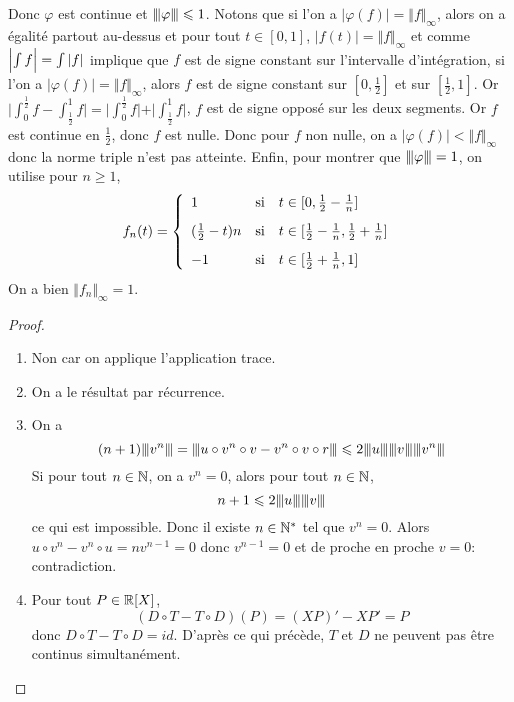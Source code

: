 Donc $\varphi$ est continue et ${\left\vert\kern-0.25ex\left\vert\kern-0.25ex\left\vert{}\varphi \right\vert\kern-0.25ex\right\vert\kern-0.25ex\right\vert}\leqslant1$. Notons que si l'on a $\vert\varphi(f)\vert=\Vert f\Vert_{\infty}$, alors on a égalité partout au-dessus et pour tout $t\in[0,1]$, $\vert f(t)\vert=\Vert f\Vert_{\infty}$ et comme $\Bigl\vert\int f\Bigr\vert=\int\vert f\vert$ implique que $f$ est de signe constant sur l'intervalle d'intégration, si l'on a $\vert\varphi(f)\vert=\Vert f\Vert_{\infty}$, alors $f$ est de signe constant sur $[0,\frac{1}{2}]$ et sur $[\frac{1}{2},1]$.  Or $\vert\int_{0}^{\frac{1}{2}}f-\int_{\frac{1}{2}}^{1}f\vert=\vert\int_{0}^{\frac{1}{2}}f\vert+\vert\int_{\frac{1}{2}}^{1}f\vert$, $f$ est de signe opposé sur les deux segments. Or $f$ est continue en $\frac{1}{2}$, donc $f$ est nulle. Donc pour $f$ non nulle, on a $\vert\varphi(f)\vert<\Vert f\Vert_{\infty}$ donc la norme triple n'est pas atteinte. Enfin, pour montrer que ${\left\vert\kern-0.25ex\left\vert\kern-0.25ex\left\vert{}\varphi \right\vert\kern-0.25ex\right\vert\kern-0.25ex\right\vert}=1$, on utilise pour $n\geqslant1$,
\begin{equation}
f_{n}(t)=
\left\{
	\begin{array}[]{lll}
		1 & \text{si} & t\in[0,\frac{1}{2}-\frac{1}{n}]\\[0.3cm]
		(\frac{1}{2}-t)n & \text{si} & t\in[\frac{1}{2}-\frac{1}{n},\frac{1}{2}+\frac{1}{n}]\\[0.3cm]
		-1 & \text{si} & t\in[\frac{1}{2}+\frac{1}{n},1]
	\end{array}
\right.
\end{equation}
On a bien $\Vert f_{n}\Vert_{\infty}=1$.

\begin{proof}
	\phantom{}
	\begin{enumerate}
		\item Non car on applique l'application trace.
		\item On a le résultat par récurrence.
		\item On a 
		\begin{equation}(n+1)\vertiii{v^{n}}=\vertiii{u\circ v^{n}\circ v-v^{n}\circ v\circ r}\leqslant 2\vertiii{u}\vertiii{v}\vertiii{v^{n}}\end{equation}
		Si pour tout $n\in\mathbb{N}$, on a $v^{n}=0$, alors pour tout $n\in\mathbb{N}$,
		\begin{equation}n+1\leqslant 2{\left\vert\kern-0.25ex\left\vert\kern-0.25ex\left\vert{}u \right\vert\kern-0.25ex\right\vert\kern-0.25ex\right\vert}{\left\vert\kern-0.25ex\left\vert\kern-0.25ex\left\vert{}v \right\vert\kern-0.25ex\right\vert\kern-0.25ex\right\vert}\end{equation}
		ce qui est impossible. Donc il existe $n\in\mathbb{N}^{*}$ tel que $v^{n}=0$. Alors $u\circ v^{n}-v^{n}\circ u=nv^{n-1}=0$ donc $v^{n-1}=0$ et de proche en proche $v=0$: contradiction.
		\item Pour tout $P\in\mathbb{R}[X]$, 
		\begin{equation}(D\circ T-T\circ D)(P)=(XP)'-XP'=P\end{equation}
		donc $D\circ T-T\circ D=id$. D'après ce qui précède, $T$ et $D$ ne peuvent pas être continus simultanément.
	\end{enumerate}
\end{proof}

